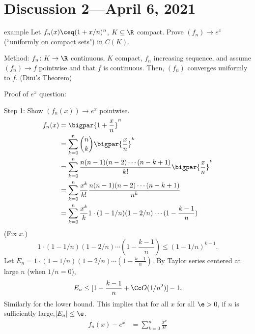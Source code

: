 \documentclass[class=article, crop=false]{standalone}
\begin{document}
\section{Discussion 2---April 6, 2021}


\begin{understandingcheck}{example}
  Let $f_n(x)\ceq (1+x/n)^n$, $K \subseteq \R$ compact. Prove $(f_n) \to e^x$ (``uniformly on compact sets") in $C(K)$.

  Method:  $f_n \colon K \to \R$ continuous, $K$ compact, $f_n$ increasing sequence, and assume $(f_n) \to f$ pointwise and that $f$ is continuous. Then, $(f_n)$ converges uniformly to $f$. (Dini's Theorem)

  Proof of $e^x$ question:
  \begin{pf}
    Step 1: Show $(f_n(x)) \to e^x$ pointwise.
      \begin{align*}
        f_n(x) &= \bigpar{1+\frac{x}{n}}^n \\
        &= \sum_{k=0}^{n} {n \choose k} \bigpar{\frac{x}{n}}^k \\
        &= \sum_{k=0}^{n} \frac{n(n-1)(n-2)\cdots(n-k+1)}{k!} \bigpar{\frac{x}{n}}^k \\
        &= \sum_{k=0}^{n} \frac{x^k}{k!} \frac{n(n-1)(n-2)\cdots(n-k+1)}{n^k} \\
        &= \sum_{k=0}^{n} \frac{x^k}{k} 1 \cdot (1-1/n)(1-2/n)\cdots(1-\frac{k-1}{n})
      \end{align*}
    (Fix $x$.)
      \[
        1 \cdot (1-1/n)(1-2/n)\cdots(1-\frac{k-1}{n}) \leq (1-1/n)^{k-1}.
      \]
    Let $E_n = 1 \cdot (1-1/n)(1-2/n)\cdots(1-\frac{k-1}{n})$.  By Taylor series centered at large $n$ (when $1/n=0$),
      \[
        E_n \leq [1-\frac{k-1}{n}+ \Cc O(1/n^2)]-1.
      \]
    Similarly for the lower bound. This implies that for all $x$ for all $\e > 0$, if $n$ is sufficiently large,$|E_n| \leq \e$.
      \begin{align*}
        f_n(x)-e^x &= \sum_{k=0}^{n} \frac{x^k}{k!}
      \end{align*}


\end{pf}
\end{understandingcheck}
\end{document}
